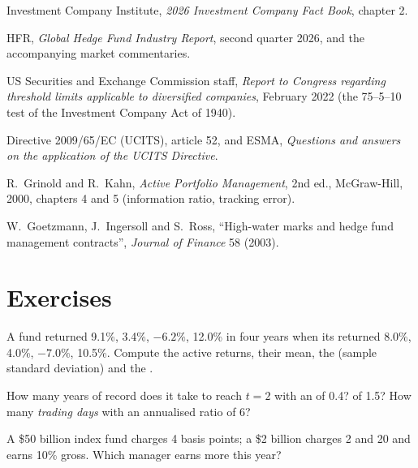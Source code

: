 \begin{omsources}
\item Investment Company Institute, \emph{2026 Investment Company Fact Book},
chapter 2.
\item HFR, \emph{Global Hedge Fund Industry Report}, second quarter 2026, and
the accompanying market commentaries.
\item US Securities and Exchange Commission staff, \emph{Report to Congress
regarding threshold limits applicable to diversified companies}, February
2022 (the 75--5--10 test of the Investment Company Act of 1940).
\item Directive 2009/65/EC (UCITS), article 52, and ESMA, \emph{Questions and
answers on the application of the UCITS Directive}.
\item R.~Grinold and R.~Kahn, \emph{Active Portfolio Management}, 2nd ed.,
McGraw-Hill, 2000, chapters 4 and 5 (information ratio, tracking error).
\item W.~Goetzmann, J.~Ingersoll and S.~Ross, ``High-water marks and hedge
fund management contracts'', \emph{Journal of Finance} 58 (2003).
\end{omsources}

\section{Exercises}

\begin{exercise}[$\star$]\label{exo:m1:the-buy-side:1}
A fund returned 9.1\%, 3.4\%, $-6.2\%$, 12.0\% in four years when its
 returned 8.0\%, 4.0\%, $-7.0\%$, 10.5\%. Compute the active
returns, their mean, the  (sample standard deviation) and the
.
\end{exercise}

\begin{exercise}[$\star$]\label{exo:m1:the-buy-side:2}
How many years of record does it take to reach $t = 2$ with an  of 0.4? of 1.5? How many \emph{trading days} with an annualised ratio
of 6?
\end{exercise}

\begin{exercise}[$\star$]\label{exo:m1:the-buy-side:3}
A \$50 billion index fund charges 4 basis points; a \$2 billion 
charges 2 and 20 and earns 10\% gross. Which manager earns more this year?
\end{exercise}

